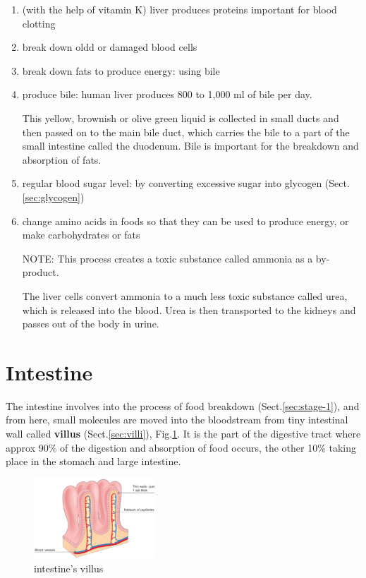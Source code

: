 \begin{enumerate}
  \item (with the help of vitamin K) liver produces proteins important for blood
  clotting
  
  \item break down oldd or damaged blood cells
  
  \item break down fats to produce energy: using bile
  
  \item produce bile: human liver produces 800 to 1,000 ml of bile per day.  
  
  This yellow, brownish or olive green liquid is collected in small ducts and
  then passed on to the main bile duct, which carries the bile to a part of the
  small intestine called the duodenum. Bile is important for the breakdown and
  absorption of fats.  

  \item regular blood sugar level:
  by converting excessive sugar into glycogen (Sect.\ref{sec:glycogen})
  
  \item  change amino acids in foods so that they can be used to produce energy,
  or make carbohydrates or fats
  
NOTE: This process creates a  toxic substance called ammonia as a by-product.

 The liver cells convert ammonia to a much less toxic substance called urea,
which is released into the blood. Urea is then transported to the kidneys and
passes out of the body in urine.
   
\end{enumerate}

\section{Intestine}
\label{sec:intestine}

The intestine involves into the process of food breakdown
(Sect.\ref{sec:stage-1}), and from here, small molecules are moved into the
bloodstream from tiny intestinal wall called {\bf villus}
(Sect.\ref{sec:villi}), Fig.\ref{fig:intestine-villus}.
It is the part of the digestive tract where approx 90\% of the digestion and
absorption of food occurs, the other 10\% taking place in the stomach and large
intestine.

\begin{figure}[htb]
  \centerline{\includegraphics[height=3cm]{./images/intestine-villus.eps}}
  \caption{intestine's villus}
  \label{fig:intestine-villus}
\end{figure}



